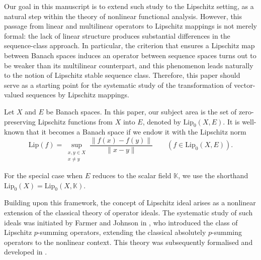 \documentclass[12pt]{amsart}
\def\K{\mathbb{K}}
\def\Lip{\mathrm{Lip}_0}
\def\Lipnorm{\mathrm{Lip}}
\begin{document}
Our goal in this manuscript is to extend such study to the Lipschitz setting, as a natural step within the theory of nonlinear functional analysis. However, this passage from linear and multilinear operators to Lipschitz mappings is not merely formal: the lack of linear structure produces substantial differences in the sequence-class approach. In particular, the criterion that ensures a Lipschitz map between Banach spaces induces an operator between sequence spaces turns out to be weaker than its multilinear counterpart, and this phenomenon leads naturally to the notion of Lipschitz stable sequence class. Therefore, this paper should serve as a starting point for the systematic study of the transformation of vector-valued sequences by Lipschitz mappings.

Let $X$ and $E$ be Banach spaces. In this paper, our subject area is the set of zero-preserving Lipschitz functions from $X$ into $E$, denoted by $\Lip(X,E)$. It is well-known that it becomes a Banach space if we endow it with the Lipschitz norm
$$
\Lipnorm(f) = \sup_{\substack{x,y \in X\\ x\neq y}} \frac{\|f(x)-f(y)\|}{\|x-y\|} \qquad (f\in\Lip(X,E)).
$$

For the special case when $E$ reduces to the scalar field $\K$, we use the shorthand $\Lip(X) = \Lip(X,\K)$.

Building upon this framework, the concept of Lipschitz ideal arises as a nonlinear extension of the classical theory of operator ideals. The systematic study of such ideals was initiated by Farmer and Johnson in \cite{FarJoh-09}, who introduced the class of Lipschitz $p$-summing operators, extending the classical absolutely $p$-summing operators to the nonlinear context. This theory was subsequently formalised and developed in \cite{AchDahTur-20, AchRueSanYah-16, JimSepVil-14, Saa-17}.
\end{document}
